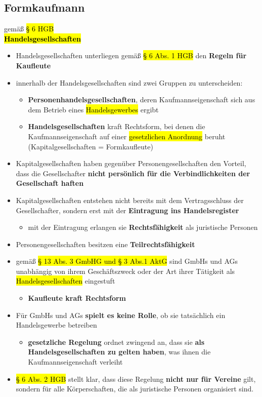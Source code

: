 \documentclass[a4paper, 10pt]{article}
\begin{document}
\subsection{Formkaufmann}
gemäß \hl{§ 6 HGB}\\[2.5mm]
\textbf{\hl{Handelsgesellschaften}}
\begin{itemize}
    \item Handelsgesellschaften unterliegen gemäß \hl{§ 6 Abs. 1 HGB} den
\textbf{Regeln für Kaufleute}
\item innerhalb der Handelsgesellschaften sind zwei Gruppen zu unterscheiden:
\begin{itemize}
    \item \textbf{Personenhandelsgesellschaften}, deren Kaufmannseigenschaft
sich aus dem Betrieb eines \hl{Handelsgewerbes} ergibt
\item \textbf{Handelsgesellschaften} kraft Rechtsform, bei denen die
Kaufmannseigenschaft auf einer \hl{gesetzlichen Anordnung}
beruht (Kapitalgesellschaften = Formkaufleute)
\end{itemize}

\item Kapitalgesellschaften haben gegenüber Personengesellschaften den Vorteil, dass die Gesellschafter \textbf{nicht persönlich für die Verbindlichkeiten der Gesellschaft haften}

\item Kapitalgesellschaften entstehen nicht bereits mit dem
Vertragsschluss der Gesellschafter, sondern erst mit der \textbf{Eintragung ins Handelsregister}
\begin{itemize}
    \item mit der Eintragung erlangen sie \textbf{Rechtsfähigkeit} als juristische Personen
\end{itemize}
\item Personengesellschaften besitzen eine \textbf{Teilrechtsfähigkeit}

\item gemäß \hl{§ 13 Abs. 3 GmbHG und § 3 Abs.1 AktG} sind GmbHs und AGs unabhängig von ihrem Geschäftszweck oder der Art ihrer Tätigkeit als \hl{Handelsgesellschaften} eingestuft
\begin{itemize}
    \item \textbf{Kaufleute kraft Rechtsform}
\end{itemize}
\item Für GmbHs und AGs \textbf{spielt es keine Rolle}, ob sie tatsächlich ein Handelsgewerbe betreiben
\begin{itemize}
    \item \textbf{gesetzliche Regelung} ordnet zwingend an, dass sie \textbf{als Handelsgesellschaften zu gelten haben}, was ihnen die Kaufmannseigenschaft verleiht
\end{itemize}
\item \hl{§ 6 Abs. 2 HGB} stellt klar, dass diese Regelung \textbf{nicht nur für Vereine} gilt, sondern für alle Körperschaften, die als juristische Personen organisiert sind.
\end{itemize}
\end{document}
